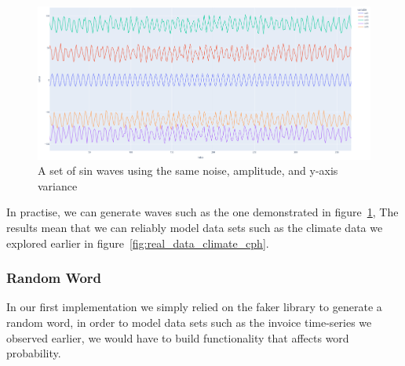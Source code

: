 \begin{figure}[H]
    \centering
    \includegraphics[width=12cm]{figures/data_generation/fake_data_sin_waves}
    \caption{A set of sin waves using the same noise, amplitude, and y-axis variance}
    \label{fig:datagen_fig_3}
\end{figure}

In practise, we can generate waves such as the one demonstrated in figure~\ref{fig:datagen_fig_3}, The results mean that
we can reliably model data sets such as the climate data we explored earlier in figure~\ref{fig:real_data_climate_cph}.

\subsubsection{Random Word}

In our first implementation we simply relied on the faker library to generate a random word, in order to model data sets
such as the invoice time-series we observed earlier, we would have to build functionality that affects word probability.
